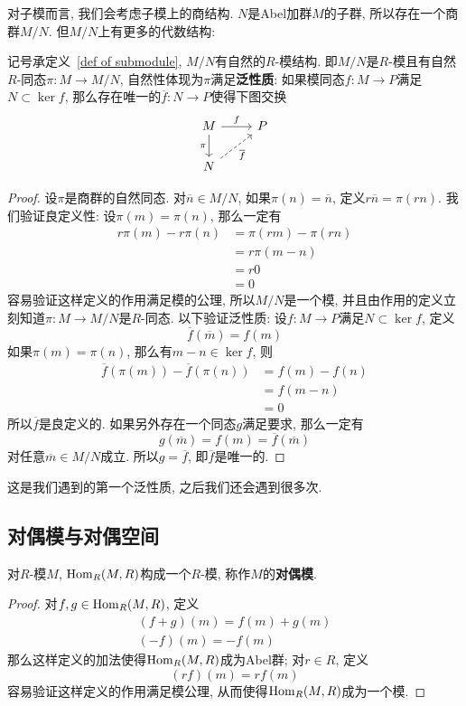 对子模而言, 我们会考虑子模上的商结构.
$N$是Abel加群$M$的子群, 所以存在一个商群$M/N$.
但$M/N$上有更多的代数结构:
\begin{prop}\label{quotient module}
    记号承定义~\ref{def of submodule}, $M/N$有自然的$R$-模结构.
    即$M/N$是$R$-模且有自然$R$-同态$\pi:M\to M/N$, 自然性体现为$\pi$满足\textbf{泛性质}:
    如果模同态$f:M\to P$满足$N\subset\ker{f}$, 那么存在唯一的$\overline{f}:N\to P$使得下图交换
    \[\begin{tikzcd}
        M \arrow[r, "f"] \arrow[d, "\pi"'] & P \\
        N \arrow[ur, dashed, "\overline{f}"'] &
    \end{tikzcd}\]
\end{prop}
\begin{proof}
    设$\pi$是商群的自然同态.
    对$\overline{n}\in M/N$, 如果$\pi(n)=\overline{n}$, 定义$r\overline{n}=\pi(rn)$.
    我们验证良定义性: 设$\pi(m)=\pi(n)$, 那么一定有
    \begin{align*}
        r\pi(m)-r\pi(n)&=\pi(rm)-\pi(rn)\\
        &=r\pi(m-n)\\
        &=r0\\
        &=0
    \end{align*}
    容易验证这样定义的作用满足模的公理, 所以$M/N$是一个模, 并且由作用的定义立刻知道$\pi:M\to M/N$是$R$-同态.
    以下验证泛性质: 设$f:M\to P$满足$N\subset\ker{f}$, 定义
    \[\overline{f}(\overline{m})=f(m)\]
    如果$\pi(m)=\pi(n)$, 那么有$m-n\in\ker{f}$, 则
    \begin{align*}
        \overline{f}(\pi(m))-\overline{f}(\pi(n))&=f(m)-f(n)\\
        &=f(m-n)\\
        &=0
    \end{align*}
    所以$\overline{f}$是良定义的.
    如果另外存在一个同态$g$满足要求, 那么一定有
    \[g(\overline{m})=f(m)=\overline{f}(\overline{m})\]
    对任意$\overline m\in M/N$成立.
    所以$g=\overline{f}$, 即$\overline{f}$是唯一的.
\end{proof}

这是我们遇到的第一个泛性质, 之后我们还会遇到很多次.

\subsection*{对偶模与对偶空间}

\begin{prop}
    对$R$-模$M$, $\operatorname*{Hom}_R(M,R)$构成一个$R$-模, 称作$M$的\textbf{对偶模}.
\end{prop}
\begin{proof}
    对$f,g\in\operatorname*{Hom}_R(M,R)$, 定义
    \begin{gather*}
        (f+g)(m)=f(m)+g(m)\\
        (-f)(m)=-f(m)
    \end{gather*}
    那么这样定义的加法使得$\operatorname*{Hom}_R(M,R)$成为Abel群;
    对$r\in R$, 定义
    \[(rf)(m)=rf(m)\]
    容易验证这样定义的作用满足模公理, 从而使得$\operatorname*{Hom}_R(M,R)$成为一个模.
\end{proof}

